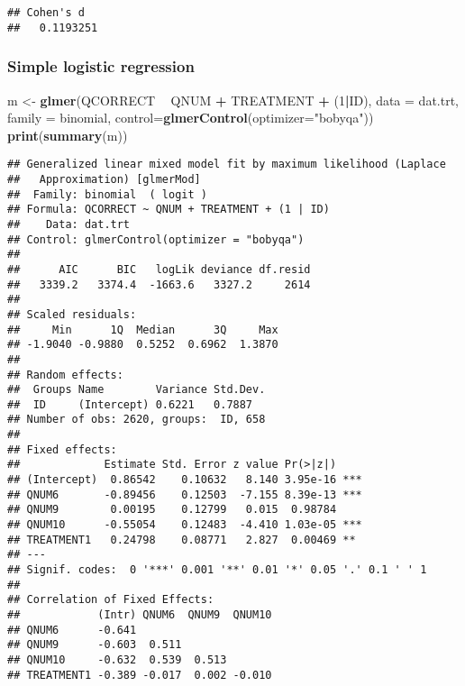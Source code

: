 \documentclass[]{article}
\newenvironment{Shaded}{\begin{snugshade}}{\end{snugshade}}
\newcommand{\KeywordTok}[1]{\textcolor[rgb]{0.13,0.29,0.53}{\textbf{#1}}}
\newcommand{\DataTypeTok}[1]{\textcolor[rgb]{0.13,0.29,0.53}{#1}}
\newcommand{\DecValTok}[1]{\textcolor[rgb]{0.00,0.00,0.81}{#1}}
\newcommand{\StringTok}[1]{\textcolor[rgb]{0.31,0.60,0.02}{#1}}
\newcommand{\OperatorTok}[1]{\textcolor[rgb]{0.81,0.36,0.00}{\textbf{#1}}}
\newcommand{\NormalTok}[1]{#1}
\begin{document}
\begin{verbatim}
## Cohen's d
##   0.1193251
\end{verbatim}

\subsubsection{Simple logistic
regression}\label{simple-logistic-regression}

\begin{Shaded}
\begin{Highlighting}[]
\NormalTok{m <-}\StringTok{ }\KeywordTok{glmer}\NormalTok{(QCORRECT }\OperatorTok{~}\StringTok{ }\NormalTok{QNUM }\OperatorTok{+}\StringTok{ }\NormalTok{TREATMENT }\OperatorTok{+}\StringTok{ }\NormalTok{(}\DecValTok{1}\OperatorTok{|}\NormalTok{ID), }
                \DataTypeTok{data =}\NormalTok{ dat.trt, }
                \DataTypeTok{family =}\NormalTok{ binomial, }\DataTypeTok{control=}\KeywordTok{glmerControl}\NormalTok{(}\DataTypeTok{optimizer=}\StringTok{"bobyqa"}\NormalTok{))}
\KeywordTok{print}\NormalTok{(}\KeywordTok{summary}\NormalTok{(m))}
\end{Highlighting}
\end{Shaded}

\begin{verbatim}
## Generalized linear mixed model fit by maximum likelihood (Laplace
##   Approximation) [glmerMod]
##  Family: binomial  ( logit )
## Formula: QCORRECT ~ QNUM + TREATMENT + (1 | ID)
##    Data: dat.trt
## Control: glmerControl(optimizer = "bobyqa")
## 
##      AIC      BIC   logLik deviance df.resid 
##   3339.2   3374.4  -1663.6   3327.2     2614 
## 
## Scaled residuals: 
##     Min      1Q  Median      3Q     Max 
## -1.9040 -0.9880  0.5252  0.6962  1.3870 
## 
## Random effects:
##  Groups Name        Variance Std.Dev.
##  ID     (Intercept) 0.6221   0.7887  
## Number of obs: 2620, groups:  ID, 658
## 
## Fixed effects:
##             Estimate Std. Error z value Pr(>|z|)    
## (Intercept)  0.86542    0.10632   8.140 3.95e-16 ***
## QNUM6       -0.89456    0.12503  -7.155 8.39e-13 ***
## QNUM9        0.00195    0.12799   0.015  0.98784    
## QNUM10      -0.55054    0.12483  -4.410 1.03e-05 ***
## TREATMENT1   0.24798    0.08771   2.827  0.00469 ** 
## ---
## Signif. codes:  0 '***' 0.001 '**' 0.01 '*' 0.05 '.' 0.1 ' ' 1
## 
## Correlation of Fixed Effects:
##            (Intr) QNUM6  QNUM9  QNUM10
## QNUM6      -0.641                     
## QNUM9      -0.603  0.511              
## QNUM10     -0.632  0.539  0.513       
## TREATMENT1 -0.389 -0.017  0.002 -0.010
\end{verbatim}
\end{document}
